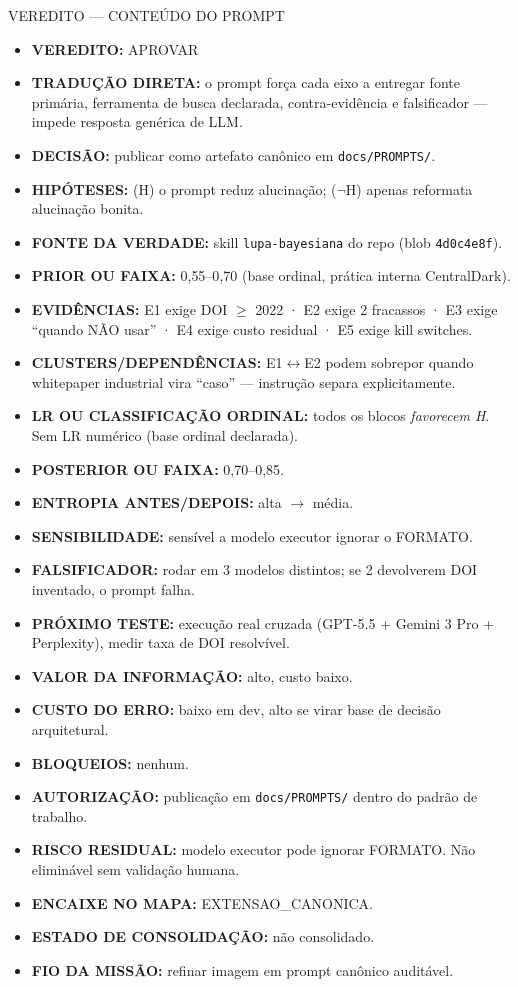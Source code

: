 \documentclass[11pt,a4paper]{article}
\begin{document}
\begin{bloco}{VEREDITO --- CONTEÚDO DO PROMPT}
\begin{itemize}[leftmargin=1.4em]
  \item \textbf{VEREDITO:} APROVAR
  \item \textbf{TRADUÇÃO DIRETA:} o prompt força cada eixo a
        entregar fonte primária, ferramenta de busca declarada,
        contra-evidência e falsificador --- impede resposta
        genérica de LLM.
  \item \textbf{DECISÃO:} publicar como artefato canônico em
        \texttt{docs/PROMPTS/}.
  \item \textbf{HIPÓTESES:} (H) o prompt reduz alucinação;
        ($\neg$H) apenas reformata alucinação bonita.
  \item \textbf{FONTE DA VERDADE:} skill \texttt{lupa-bayesiana}
        do repo (blob \texttt{4d0c4e8f}).
  \item \textbf{PRIOR OU FAIXA:} 0{,}55--0{,}70 (base ordinal,
        prática interna CentralDark).
  \item \textbf{EVIDÊNCIAS:} E1 exige DOI $\ge$ 2022 · E2 exige
        2 fracassos · E3 exige ``quando NÃO usar'' · E4 exige
        custo residual · E5 exige kill switches.
  \item \textbf{CLUSTERS/DEPENDÊNCIAS:} E1$\leftrightarrow$E2
        podem sobrepor quando whitepaper industrial vira ``caso''
        --- instrução separa explicitamente.
  \item \textbf{LR OU CLASSIFICAÇÃO ORDINAL:} todos os blocos
        \emph{favorecem H}. Sem LR numérico (base ordinal
        declarada).
  \item \textbf{POSTERIOR OU FAIXA:} 0{,}70--0{,}85.
  \item \textbf{ENTROPIA ANTES/DEPOIS:} alta $\to$ média.
  \item \textbf{SENSIBILIDADE:} sensível a modelo executor
        ignorar o FORMATO.
  \item \textbf{FALSIFICADOR:} rodar em 3 modelos distintos;
        se 2 devolverem DOI inventado, o prompt falha.
  \item \textbf{PRÓXIMO TESTE:} execução real cruzada
        (GPT-5.5 + Gemini 3 Pro + Perplexity), medir taxa de
        DOI resolvível.
  \item \textbf{VALOR DA INFORMAÇÃO:} alto, custo baixo.
  \item \textbf{CUSTO DO ERRO:} baixo em dev, alto se virar
        base de decisão arquitetural.
  \item \textbf{BLOQUEIOS:} nenhum.
  \item \textbf{AUTORIZAÇÃO:} publicação em
        \texttt{docs/PROMPTS/} dentro do padrão de trabalho.
  \item \textbf{RISCO RESIDUAL:} modelo executor pode ignorar
        FORMATO. Não eliminável sem validação humana.
  \item \textbf{ENCAIXE NO MAPA:} EXTENSAO\_CANONICA.
  \item \textbf{ESTADO DE CONSOLIDAÇÃO:} não consolidado.
  \item \textbf{FIO DA MISSÃO:} refinar imagem em prompt
        canônico auditável.
\end{itemize}
\end{bloco}
\end{document}
